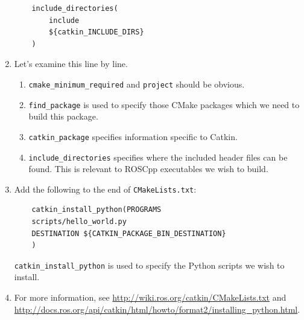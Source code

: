 \documentclass{article}
\begin{document}
\begin{enumerate}
\begin{verbatim}
    include_directories(
        include
        ${catkin_INCLUDE_DIRS}
    )
        \end{verbatim}
        \item Let's examine this line by line.
        \begin{enumerate}
            \item \texttt{cmake\_minimum\_required} and \texttt{project}
            should be obvious.
            \item \texttt{find\_package} is used to specify those CMake packages which 
            we need to build this package.
            \item \texttt{catkin\_package} specifies information specific to Catkin.
            \item \texttt{include\_directories} specifies where the included header files
            can be found. This is relevant to ROSCpp executables we wish to build.
        \end{enumerate}
        \item Add the following to the end of \texttt{CMakeLists.txt}:
        \begin{verbatim}
    catkin_install_python(PROGRAMS
    scripts/hello_world.py
    DESTINATION ${CATKIN_PACKAGE_BIN_DESTINATION}
    )
        \end{verbatim}
        \texttt{catkin\_install\_python} is used to specify the Python scripts 
        we wish to install.

        \item For more information, see \url{http://wiki.ros.org/catkin/CMakeLists.txt} and 
        \url{http://docs.ros.org/api/catkin/html/howto/format2/installing_python.html}.


\end{enumerate}
\end{document}
